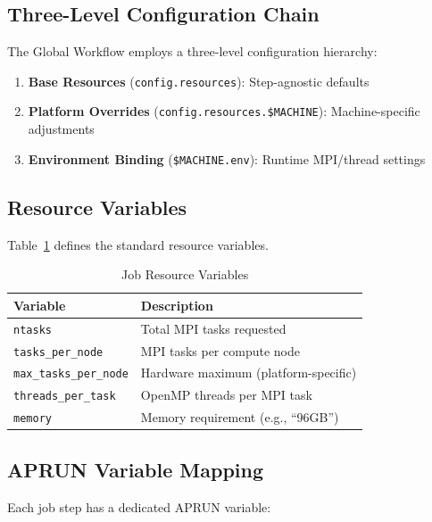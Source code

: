 \documentclass[11pt,a4paper,twoside]{article}
\begin{document}
\subsection{Three-Level Configuration Chain}

The Global Workflow employs a three-level configuration hierarchy:

\begin{enumerate}
    \item \textbf{Base Resources} (\texttt{config.resources}): Step-agnostic defaults
    \item \textbf{Platform Overrides} (\texttt{config.resources.\$MACHINE}): Machine-specific adjustments
    \item \textbf{Environment Binding} (\texttt{\$MACHINE.env}): Runtime MPI/thread settings
\end{enumerate}

\subsection{Resource Variables}

Table~\ref{tab:resources} defines the standard resource variables.

\begin{table}[H]
\centering
\caption{Job Resource Variables}
\label{tab:resources}
\begin{tabular}{@{}lp{8cm}@{}}
\toprule
\textbf{Variable} & \textbf{Description} \\
\midrule
\texttt{ntasks} & Total MPI tasks requested \\
\texttt{tasks\_per\_node} & MPI tasks per compute node \\
\texttt{max\_tasks\_per\_node} & Hardware maximum (platform-specific) \\
\texttt{threads\_per\_task} & OpenMP threads per MPI task \\
\texttt{memory} & Memory requirement (e.g., ``96GB'') \\
\bottomrule
\end{tabular}
\end{table}

\subsection{APRUN Variable Mapping}

Each job step has a dedicated APRUN variable:
\end{document}
